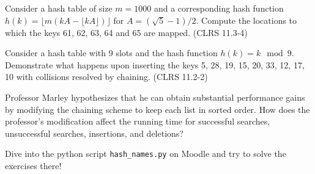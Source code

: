 \documentclass{article}
\begin{document}
\thispagestyle{fancy}

\begin{Exercise}[title={Simple training exercises}]
    \Question
    Consider a hash table of size $m=1000$ and a corresponding hash function
    $h(k) = \lfloor m(kA - \lfloor kA \rfloor) \rfloor$ for $A = (\sqrt{5} -
    1)/2$. Compute the locations to which the keys 61, 62, 63, 64 and 65 are
    mapped. (CLRS 11.3-4)

    \Question
    Consider a hash table with 9 slots and the hash function $h(k) = k \mod 9$.
    Demonstrate what happens upon inserting the keys 5, 28, 19, 15, 20, 33, 12,
    17, 10 with collisions resolved by chaining. (CLRS 11.2-2)

    \Question
    Professor Marley hypothesizes that he can obtain substantial performance
    gains by modifying the chaining scheme to keep each list in sorted order.
    How does the professor's modification affect the running time for successful
    searches, unsuccessful searches, insertions, and deletions?

\end{Exercise}

\begin{Exercise}[title={Fun creative exercises!}]
    Dive into the python script \texttt{hash\_names.py} on Moodle and try to
    solve the exercises there!
\end{Exercise}
\end{document}

